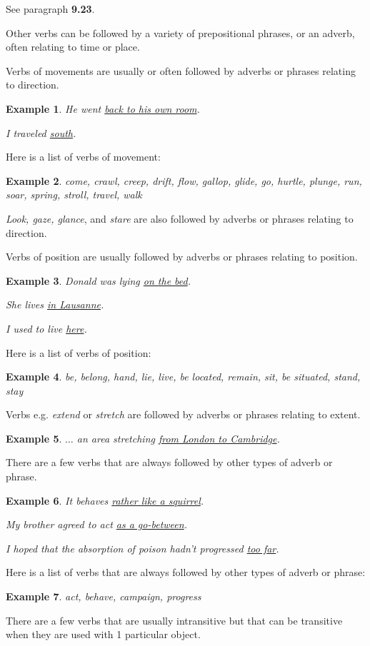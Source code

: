 \documentclass[oneside]{book}
\numberwithin{equation}{section}
\newtheorem{example}{Example}[section]
\begin{document}
See paragraph \textbf{9.23}.

%
\noindent{} Other verbs can be followed by a variety of prepositional phrases, or an adverb, often relating to time or place.

%
Verbs of movements are usually or often followed by adverbs or phrases relating to direction.
\begin{example}
    He went \underline{back to his own room}.
    
    I traveled \underline{south}.
\end{example}
Here is a list of verbs of movement:
\begin{example}
    come, crawl, creep, drift, flow, gallop, glide, go, hurtle, plunge, run, soar, spring, stroll, travel, walk
\end{example}
\textit{Look, gaze, glance}, and \textit{stare} are also followed by adverbs or phrases relating to direction.

%
Verbs of position are usually followed by adverbs or phrases relating to position.
\begin{example}
    Donald was lying \underline{on the bed}.
    
    She lives \underline{in Lausanne}.
    
    I used to live \underline{here}.
\end{example}
Here is a list of verbs of position:
\begin{example}
    be, belong, hand, lie, live, be located, remain, sit, be situated, stand, stay
\end{example}
Verbs e.g. \textit{extend} or \textit{stretch} are followed by adverbs or phrases relating to extent.
\begin{example}
    $\ldots$ an area stretching \underline{from London to Cambridge}.
\end{example}
There are a few verbs that are always followed by other types of adverb or phrase.
\begin{example}
    It behaves \underline{rather like a squirrel}.
    
    My brother agreed to act \underline{as a go-between}.
    
    I hoped that the absorption of poison hadn't progressed \underline{too far}.
\end{example}
Here is a list of verbs that are always followed by other types of adverb or phrase:
\begin{example}
    act, behave, campaign, progress
\end{example}
%
\noindent{} There are a few verbs that are usually intransitive but that can be transitive when they are used with 1 particular object.
\end{document}
